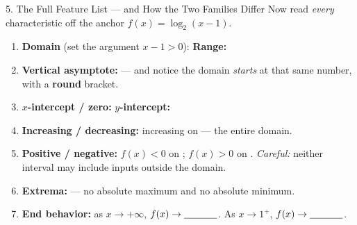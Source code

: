 \documentclass[10pt]{article}
\newcommand{\lgrid}[4]{%
  \draw[step=1, linegray!40, very thin] (#1,#3) grid (#2,#4);
  \draw[->, semithick, charcoal] (#1,0)--(#2,0) node[below right, font=\scriptsize]{$x$};
  \draw[->, semithick, charcoal] (0,#3)--(0,#4) node[left, font=\scriptsize]{$y$};}
\newcommand{\logcurve}[5]{\draw[very thick, forest, domain=#4:#5, samples=120, smooth]
  plot ({pow(#1,\x-(#3))+(#2)},{\x});}
\begin{document}
\begin{notesbox}{5. The Full Feature List --- and How the Two Families Differ}
Now read \emph{every} characteristic off the anchor $f(x)=\log_2(x-1)$.
\begin{center}
\end{center}
\begin{enumerate}[leftmargin=1.7em, itemsep=3pt]
  \item \textbf{Domain} (set the argument $x-1>0$): \blank{3.4cm} \quad \textbf{Range:}
        \blank{3.4cm}
  \item \textbf{Vertical asymptote:} \blank{1.8cm} --- and notice the domain \emph{starts} at that
        same number, with a \textbf{round} bracket.
  \item \textbf{$x$-intercept / zero:} \blank{1.8cm} \quad \textbf{$y$-intercept:} \blank{1.8cm}
  \item \textbf{Increasing / decreasing:} increasing on \blank{3.0cm} --- the entire domain.
  \item \textbf{Positive / negative:} $f(x)<0$ on \blank{2.6cm}; \quad $f(x)>0$ on \blank{2.6cm}.
        \emph{Careful:} neither interval may include inputs outside the domain.
  \item \textbf{Extrema:} \blank{2.6cm} --- no absolute maximum and no absolute minimum.
  \item \textbf{End behavior:} as $x\to+\infty$, $f(x)\to\blank{1.2cm}$. \; As $x\to 1^{+}$,
        $f(x)\to\blank{1.2cm}$.
\end{enumerate}


\end{notesbox}
\end{document}
